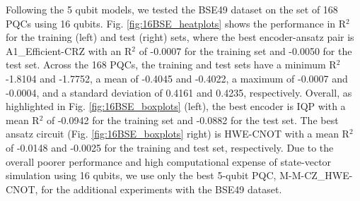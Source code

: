 \documentclass[journal=jacsat,manuscript=article]{achemso}
\begin{document}
Following the 5 qubit models, we tested the BSE49 dataset on the set of 168 PQCs using 16 qubits.
Fig. \ref{fig:16BSE_heatplots} shows the performance in R$^{2}$ for the training (left) and test (right) sets, where the best encoder-ansatz pair is A1{\_}Efficient-CRZ with an R$^{2}$ of -0.0007 for the training set and -0.0050 for the test set.
Across the 168 PQCs, the training and test sets have a minimum R$^{2}$ -1.8104 and -1.7752, a mean of -0.4045 and -0.4022, a maximum of -0.0007 and -0.0004, and a standard deviation of 0.4161 and 0.4235, respectively.
Overall, as highlighted in Fig. \ref{fig:16BSE_boxplots} (left), the best encoder is IQP with a mean R$^{2}$ of -0.0942 for the training set and -0.0882 for the test set.
The best ansatz circuit (Fig. \ref{fig:16BSE_boxplots} right) is HWE-CNOT with a mean R$^{2}$ of -0.0148 and -0.0025 for the training and test set, respectively.
Due to the overall poorer performance and high computational expense of state-vector simulation using 16 qubits, we use only the best 5-qubit PQC, M-M-CZ{\_}HWE-CNOT, for the additional experiments with the BSE49 dataset.
\end{document}
